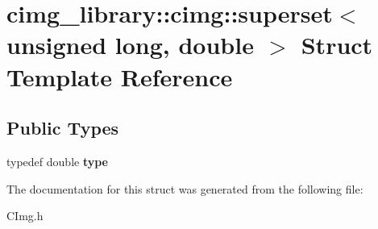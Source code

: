\hypertarget{structcimg__library_1_1cimg_1_1superset_3_01unsigned_01long_00_01double_01_4}{\section{cimg\-\_\-library\-:\-:cimg\-:\-:superset$<$ unsigned long, double $>$ Struct Template Reference}
\label{structcimg__library_1_1cimg_1_1superset_3_01unsigned_01long_00_01double_01_4}
}
\subsection*{Public Types}
\begin{DoxyCompactItemize}
\item 
\hypertarget{structcimg__library_1_1cimg_1_1superset_3_01unsigned_01long_00_01double_01_4_afa2ae8945beaf561a9d85bfa5822681e}{typedef double {\bfseries type}}\label{structcimg__library_1_1cimg_1_1superset_3_01unsigned_01long_00_01double_01_4_afa2ae8945beaf561a9d85bfa5822681e}

\end{DoxyCompactItemize}


The documentation for this struct was generated from the following file\-:\begin{DoxyCompactItemize}
\item 
C\-Img.\-h\end{DoxyCompactItemize}

